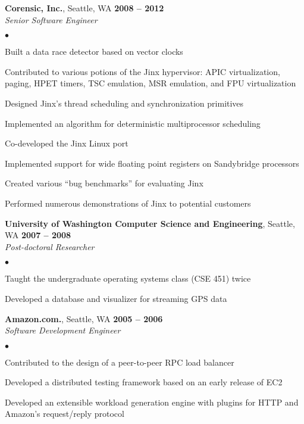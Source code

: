 \documentclass[margin,line]{res}
\newenvironment{list2}{
  \begin{list}{$\bullet$}{%
      \setlength{\itemsep}{0in}
      \setlength{\parsep}{0in} \setlength{\parskip}{0in}
      \setlength{\topsep}{0in} \setlength{\partopsep}{0in} 
      \setlength{\leftmargin}{0.2in}}}{\end{list}}
\begin{document}
\begin{resume}
\textbf{Corensic, Inc.}, Seattle, WA  \hfill \textbf{2008 -- 2012} \\\vspace{-4mm}
\textsl{Senior Software Engineer} \\
\begin{list2}
  \item Built a data race detector based on vector clocks
  \item Contributed to various potions of the Jinx hypervisor: APIC
    virtualization, paging,  HPET timers, TSC emulation, MSR emulation, and
    FPU virtualization
  \item Designed Jinx's thread scheduling and synchronization primitives
  \item Implemented an algorithm for deterministic multiprocessor scheduling
  \item Co-developed the Jinx Linux port
  \item Implemented support for wide floating point registers on Sandybridge processors
  \item Created various ``bug benchmarks''  for evaluating Jinx
  \item Performed numerous demonstrations of Jinx to potential customers
\end{list2}

\textbf{University of Washington Computer Science and Engineering}, Seattle,
WA \hfill \textbf{2007 -- 2008}\\\vspace{-4mm}
\textsl{Post-doctoral Researcher} \\
\begin{list2}
    \item Taught the undergraduate operating systems class (CSE 451) twice
    \item Developed a database and visualizer for streaming GPS data
\end{list2}

\textbf{Amazon.com.}, Seattle, WA \hfill \textbf{2005 -- 2006} \\\vspace{-4mm}
\textsl{Software Development Engineer} \\
\begin{list2}
  \item Contributed to the design of a peer-to-peer RPC load balancer
  \item Developed a distributed testing framework based on an early release of EC2
  \item Developed an extensible workload generation engine with  plugins for
    HTTP and Amazon's request/reply protocol
\end{list2}


\end{resume}
\end{document}

